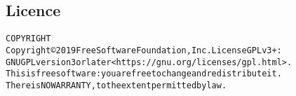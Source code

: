 \subsection*{Licence}

\begin{alltt}
COPYRIGHT
       Copyright \copyright 2019 Free Software Foundation, Inc.  License GPLv3+:
  GNU GPL version 3 or later <https://gnu.org/licenses/gpl.html>.
       This is free software: you are free to change and redistribute it.
  There is NO WARRANTY, to the extent permitted by law.

\end{alltt}

\pagebreak

\printglossary[
  style=topicmcols,
  nonumberlist,
  ]


\printglossary[
  type=mech,
  style=topicmcols,
  ]
